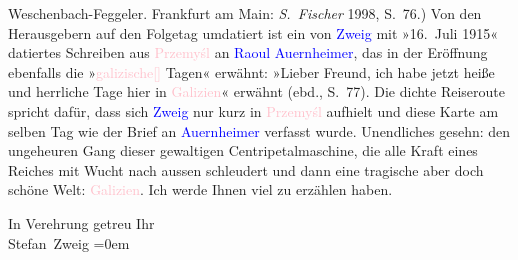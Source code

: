 {{{                     Weschenbach-Feggeler. Frankfurt am Main: \emph{S. Fischer}{ }1998, S. 76.)
                  Von den Herausgebern auf den Folgetag umdatiert ist ein von \textcolor{blue}{Zweig}
                  mit »16. Juli 1915« datiertes Schreiben aus \textcolor{pink}{Przemyśl}
                  an \textcolor{blue}{Raoul Auernheimer}, das in der Eröffnung 
                  ebenfalls die »\textcolor{pink}{galizische[]} Tagen« erwähnt: »Lieber Freund, ich habe jetzt heiße und herrliche Tage hier in \textcolor{pink}{Galizien}«
                  erwähnt (ebd., S. 77). Die dichte Reiseroute spricht dafür, dass sich \textcolor{blue}{Zweig} nur
                  kurz in \textcolor{pink}{Przemyśl} aufhielt und diese Karte am selben Tag
                  wie der Brief an \textcolor{blue}{Auernheimer} verfasst wurde.}}}\label{K_L03656-2}
               Unendliches gesehn: den ungeheuren Gang dieser gewaltigen Centripetalmaschine, die
               alle Kraft eines Reiches mit Wucht nach aussen schleudert und dann eine tragische
               aber doch schöne Welt: \textcolor{pink}{Galizien}\ledrightnote{\textcolor{pink}{Galizien}}. Ich werde Ihnen
               viel zu erzählen haben. \pend
           
\pstart
           In Verehrung getreu Ihr{\\[\baselineskip]}\spacefill\mbox{Stefan Zweig}\pend
           \leftskip=0em{}\endnumbering{}  
      